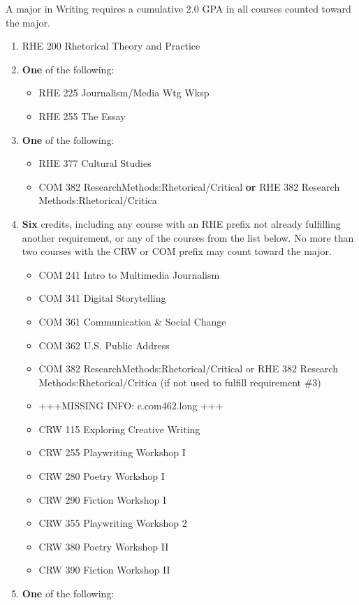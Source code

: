\documentclass[
  letterpaper,
]{scrbook}
\providecommand{\tightlist}{%
  \setlength{\itemsep}{0pt}\setlength{\parskip}{0pt}}
\begin{document}
A major in Writing requires a cumulative 2.0 GPA in all courses counted
toward the major.

\begin{enumerate}
\def\labelenumi{\arabic{enumi}.}
\item
  RHE 200 Rhetorical Theory and Practice
\item
  \textbf{One} of the following:

  \begin{itemize}
  \tightlist
  \item
    RHE 225 Journalism/Media Wtg Wksp
  \item
    RHE 255 The Essay
  \end{itemize}
\item
  \textbf{One} of the following:

  \begin{itemize}
  \tightlist
  \item
    RHE 377 Cultural Studies
  \item
    COM 382 ResearchMethods:Rhetorical/Critical \textbf{or} RHE 382
    Research Methods:Rhetorical/Critica
  \end{itemize}
\item
  \textbf{Six} credits, including any course with an RHE prefix not
  already fulfilling another requirement, or any of the courses from the
  list below. No more than two courses with the CRW or COM prefix may
  count toward the major.

  \begin{itemize}
  \tightlist
  \item
    COM 241 Intro to Multimedia Journalism
  \item
    COM 341 Digital Storytelling
  \item
    COM 361 Communication \& Social Change
  \item
    COM 362 U.S. Public Address
  \item
    COM 382 ResearchMethods:Rhetorical/Critical or RHE 382 Research
    Methods:Rhetorical/Critica (if not used to fulfill requirement \#3)
  \item
    +++MISSING INFO: c.com462.long +++
  \item
    CRW 115 Exploring Creative Writing
  \item
    CRW 255 Playwriting Workshop I
  \item
    CRW 280 Poetry Workshop I
  \item
    CRW 290 Fiction Workshop I
  \item
    CRW 355 Playwriting Workshop 2
  \item
    CRW 380 Poetry Workshop II
  \item
    CRW 390 Fiction Workshop II
  \end{itemize}
\item
  \textbf{One} of the following:


\end{enumerate}
\end{document}
